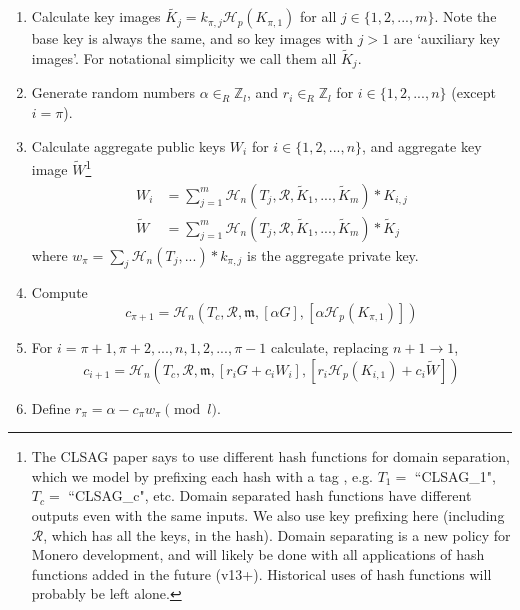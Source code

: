 \begin{enumerate}
	\item Calculate key images \(\tilde{K_j} = k_{\pi, j} \mathcal{H}_p(K_{\pi, 1})\) for all \(j \in \{1, 2, ..., m\}\). Note the base key is always the same, and so key images with $j>1$ are `auxiliary key images'. For notational simplicity we call them all $\tilde{K}_j$.

	\item Generate random numbers  \(\alpha \in_R \mathbb{Z}_l\), and \(r_{i} \in_R \mathbb{Z}_l\) for \(i \in \{1, 2, ..., n\}\) (except \(i = \pi\)).

    \item Calculate aggregate public keys $W_i$ for \(i \in \{1, 2, ..., n\}\), and aggregate key image $\tilde{W}$\footnote{The CLSAG paper says to use different hash functions for domain separation, which we model by prefixing each hash with a tag \cite{MRL-0011-CLSAG}, e.g. $T_1 =$ ``CLSAG\_1", $T_c =$ ``CLSAG\_c", etc. Domain separated hash functions have different outputs even with the same inputs. We also use key prefixing here (including $\mathcal{R}$, which has all the keys, in the hash). Domain separating is a new policy for Monero development, and will likely be done with all applications of hash functions added in the future (v13+). Historical uses of hash functions will probably be left alone.}%
    \begin{align*}
    W_i &= \sum^{m}_{j=1} \mathcal{H}_n(T_j, \mathcal{R}, \tilde{K}_1,...,\tilde{K}_{m})*K_{i,j}\\
    \tilde{W} &= \sum^{m}_{j=1} \mathcal{H}_n(T_j, \mathcal{R}, \tilde{K}_1,...,\tilde{K}_{m})*\tilde{K}_j
    \end{align*}{}
    where $w_{\pi} = \sum_j \mathcal{H}_n(T_j,...)*k_{\pi,j}$ is the aggregate private key.

	\item Compute
	\[c_{\pi+1} = \mathcal{H}_n(T_c, \mathcal{R}, \mathfrak{m}, [\alpha G], [\alpha \mathcal{H}_p(K_{\pi, 1})])\]

	\item For \(i = \pi+1, \pi+2, ..., n, 1, 2, ..., \pi-1\) calculate, replacing \(n + 1 \rightarrow 1\),\vspace{.175cm}
	\[c_{i+1} = \mathcal{H}_n(T_c, \mathcal{R}, \mathfrak{m}, [r_i G + c_i W_i], [r_{i} \mathcal{H}_p(K_{i,1}) + c_i \tilde{W}])\]

	\item Define \(r_{\pi} = \alpha - c_\pi w_\pi \pmod l\).
\end{enumerate}

